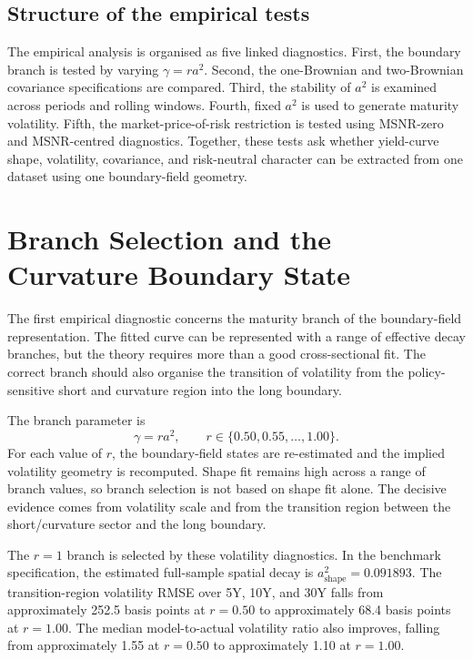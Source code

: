 \documentclass[11pt]{article}
\begin{document}
\subsection{Structure of the empirical tests}

The empirical analysis is organised as five linked diagnostics. First, the boundary branch is tested by varying $\gamma=ra^2$. Second, the one-Brownian and two-Brownian covariance specifications are compared. Third, the stability of $a^2$ is examined across periods and rolling windows. Fourth, fixed $a^2$ is used to generate maturity volatility. Fifth, the market-price-of-risk restriction is tested using MSNR-zero and MSNR-centred diagnostics. Together, these tests ask whether yield-curve shape, volatility, covariance, and risk-neutral character can be extracted from one dataset using one boundary-field geometry.

\section{Branch Selection and the Curvature Boundary State}

The first empirical diagnostic concerns the maturity branch of the boundary-field representation. The fitted curve can be represented with a range of effective decay branches, but the theory requires more than a good cross-sectional fit. The correct branch should also organise the transition of volatility from the policy-sensitive short and curvature region into the long boundary.

The branch parameter is
\begin{equation}
  \gamma=ra^2,\qquad r\in\{0.50,0.55,\ldots,1.00\}.
\end{equation}
For each value of $r$, the boundary-field states are re-estimated and the implied volatility geometry is recomputed. Shape fit remains high across a range of branch values, so branch selection is not based on shape fit alone. The decisive evidence comes from volatility scale and from the transition region between the short/curvature sector and the long boundary.

The $r=1$ branch is selected by these volatility diagnostics. In the benchmark specification, the estimated full-sample spatial decay is $a^2_{\mathrm{shape}}=0.091893$. The transition-region volatility RMSE over 5Y, 10Y, and 30Y falls from approximately 252.5 basis points at $r=0.50$ to approximately 68.4 basis points at $r=1.00$. The median model-to-actual volatility ratio also improves, falling from approximately 1.55 at $r=0.50$ to approximately 1.10 at $r=1.00$.
\end{document}
